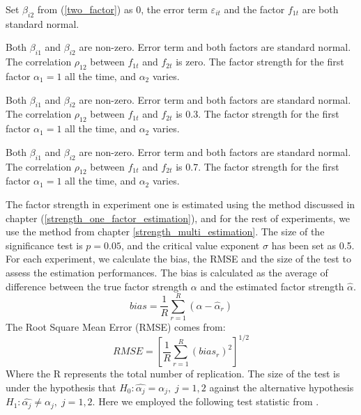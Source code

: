 \begin{experiment}
Set $\beta_{i2}$ from (\ref{two_factor}) as 0, the error term $\varepsilon_{it}$ and the factor $f_{1t}$ are both standard normal.
\end{experiment}

\begin{experiment}
Both $\beta_{i1}$ and $\beta_{i2}$ are non-zero. Error term and both factors are standard normal. The correlation $\rho_{12}$ between $f_{1t}$ and $f_{2t}$ is zero. 
The factor strength for the first factor $\alpha_1 = 1$ all the time, and $\alpha_2$ varies.
\end{experiment}

\begin{experiment}
Both $\beta_{i1}$ and $\beta_{i2}$ are non-zero. Error term  and both factors are standard normal. The correlation $\rho_{12}$ between $f_{1t}$ and $f_{2t}$ is 0.3.
The factor strength for the first factor $\alpha_1 = 1$ all the time, and $\alpha_2$ varies.
\end{experiment}

\begin{experiment}
	Both $\beta_{i1}$ and $\beta_{i2}$ are non-zero. Error term and both factors are standard normal. The correlation $\rho_{12}$ between $f_{1t}$ and $f_{2t}$ is 0.7.
	The factor strength for the first factor $\alpha_1 = 1$ all the time, and $\alpha_2$ varies.
\end{experiment}

The factor strength in experiment one is estimated using the method discussed in chapter (\ref{strength_one_factor_estimation}), and for the rest of experiments, we use the method from chapter \ref{strength_multi_estimation}.
The size of the significance test is $p = 0.05$, and the critical value exponent $\sigma$ has been set as 0.5.
For each experiment, we calculate the bias, the RMSE and the size of the test to assess the estimation performances.
The bias is calculated as the average of difference between the true factor strength $\alpha$ and the estimated factor strength $\hat{\alpha}$.
\[bias = \frac{1}{R}\sum_{r = 1}^R(\alpha - \hat{\alpha}_r)\]
The Root Square Mean Error (RMSE) comes from:
\[ RMSE =[\frac{1}{R}\sum_{r=1}^{R}(bias_r)^2 ]^{1/2}\]
Where the R represents the total number of replication.
The size of the test is under the hypothesis that $H_0: \hat{\alpha_j} = \alpha_j,\;j =1, 2$ against the alternative hypothesis $H_1:\hat{\alpha_j} \neq \alpha_j,\; j=1,2$.
Here we employed the following test statistic from .

